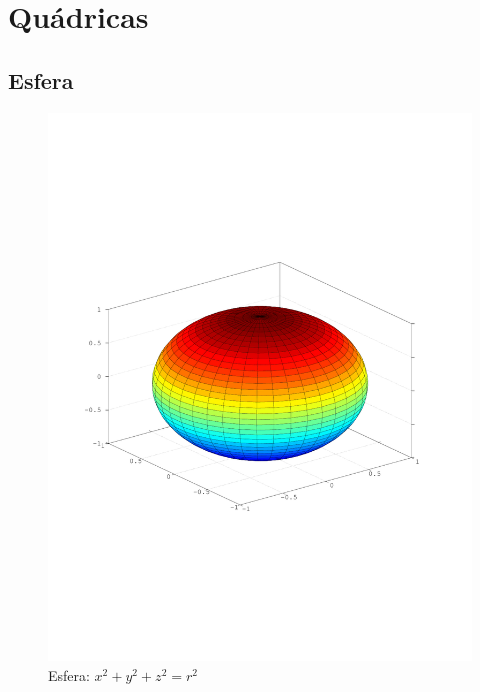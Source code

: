 
\chapter{Quádricas} %
\label{cha:quadricas}

\section{Esfera} %
\label{sec:esfera}
\begin{definicao}
\end{definicao}

\begin{figure}[!h]
	\centering
	\caption{Esfera: $x^2 + y^2 + z^2 = r^2$}
	\includegraphics[scale=0.8]{quadricas/esfera.pdf}
\end{figure}

